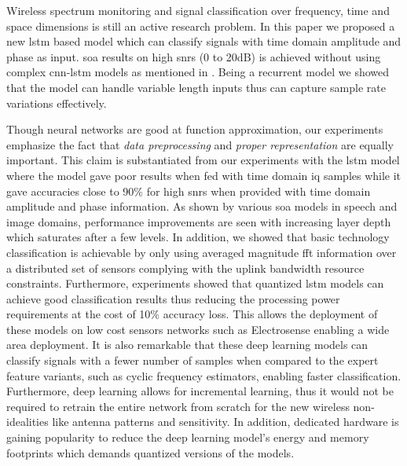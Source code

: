 Wireless spectrum monitoring and signal classification over frequency, time and space dimensions is still an active research problem. In this paper we proposed a new \ac{lstm} based model which can classify signals with time domain amplitude and phase as input. \ac{soa} results on high \ac{snr}s (0 to 20dB) is achieved without using complex \ac{cnn}-\ac{lstm} models as mentioned in \cite{baseline}. Being a recurrent model we showed that the model can handle variable length inputs thus can capture sample rate variations effectively.





Though neural networks are good at function approximation, our experiments emphasize the fact that \emph{data preprocessing} and \emph{proper representation} are equally important. This claim is substantiated from our experiments with the \ac{lstm} model where the model gave poor results when fed with time domain \ac{iq} samples while it gave accuracies close to 90\% for high \ac{snr}s when provided with time domain amplitude and phase information. %
 As shown by various \ac{soa} models in speech and image domains, performance improvements are seen with increasing layer depth which saturates after a few levels. In addition, we showed that basic technology classification is achievable by only using averaged magnitude \ac{fft} information over a distributed set of sensors complying with the uplink bandwidth resource constraints. Furthermore, experiments showed that quantized \ac{lstm} models can achieve good classification results thus reducing the processing power requirements at the cost of 10\% accuracy loss. This allows the deployment of these models on low cost sensors networks such as Electrosense enabling a wide area deployment. It is also remarkable that these deep learning models can classify signals with a fewer number of samples when compared to the expert feature variants, such as cyclic frequency estimators, enabling faster classification. Furthermore, deep learning allows for incremental learning, thus it would not be required to retrain the entire network from scratch for the new wireless non-idealities like antenna patterns and sensitivity. In addition, dedicated hardware is gaining popularity to reduce the deep learning model's energy and memory footprints which demands quantized versions of the models.

